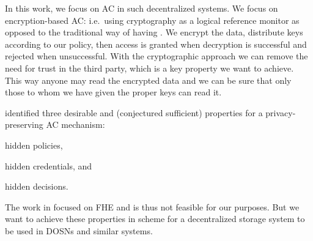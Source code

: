 In this work, we focus on \ac{AC} in such decentralized systems.
We focus on encryption-based \ac{AC}: i.e.\ using cryptography as a logical 
reference monitor as opposed to the traditional way of having .
We encrypt the data, distribute keys according to our policy, then access is 
granted when decryption is successful and rejected when unsuccessful.
With the cryptographic approach we can remove the need for trust in the third 
party, which is a key property we want to achieve.
This way anyone may read the encrypted data and we can be sure that only those 
to whom we have given the proper keys can read it.

%


\citet{TowardsPPACwHPHCHD} identified three desirable and (conjectured 
sufficient) properties for a privacy-preserving \ac{AC} mechanism:
\begin{inparablank}
\item hidden policies,
\item hidden credentials, and
\item hidden decisions.
\end{inparablank}
The work in \cite{TowardsPPACwHPHCHD} focused on \ac{FHE} and is thus not 
feasible for our purposes.
But we want to achieve these properties in  scheme for a decentralized 
storage system to be used in \acp{DOSN} and similar systems.

